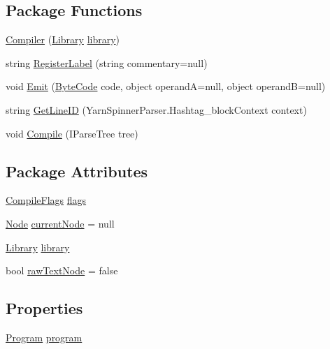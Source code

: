 \subsection*{Package Functions}
\begin{DoxyCompactItemize}
\item 
\hyperlink{a00051_a4b004fdb6aa93abee8a1a94a22ea9660}{Compiler} (\hyperlink{a00121}{Library} \hyperlink{a00051_ae211a0c080d18575bc3d299c207ef8ee}{library})
\item 
string \hyperlink{a00051_a1bae0d8b701a59708641aa36ea971fa5}{Register\-Label} (string commentary=null)
\item 
void \hyperlink{a00051_a07d6540806e6dbcbac4c1f5d5dd0cab0}{Emit} (\hyperlink{a00048_ad5dfb6ee68ca7469623ad3e459f98894}{Byte\-Code} code, object operand\-A=null, object operand\-B=null)
\item 
string \hyperlink{a00051_a88503fee196f5aa36ce01e727a34fab6}{Get\-Line\-I\-D} (Yarn\-Spinner\-Parser.\-Hashtag\-\_\-block\-Context context)
\item 
void \hyperlink{a00051_a5e3cfcde58526c1642071e51f7dac4c9}{Compile} (I\-Parse\-Tree tree)
\end{DoxyCompactItemize}
\subsection*{Package Attributes}
\begin{DoxyCompactItemize}
\item 
\hyperlink{a00051_a00347}{Compile\-Flags} \hyperlink{a00051_a541022d89bcf9bc8f794eb6d6b438d08}{flags}
\item 
\hyperlink{a00048_a00351}{Node} \hyperlink{a00051_a7384f3d524959a489d51a0a9e1f0477d}{current\-Node} = null
\item 
\hyperlink{a00121}{Library} \hyperlink{a00051_ae211a0c080d18575bc3d299c207ef8ee}{library}
\item 
bool \hyperlink{a00051_af6afc8ccb59931650919b863d62d52a4}{raw\-Text\-Node} = false
\end{DoxyCompactItemize}
\subsection*{Properties}
\begin{DoxyCompactItemize}
\item 
\hyperlink{a00138}{Program} \hyperlink{a00051_aa1737da428ec7d597009661dd8a47829}{program}
\end{DoxyCompactItemize}
